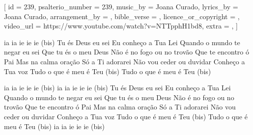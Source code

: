 
[
    id                     = {239},
    psalterio_number       = {239},
    music_by               = {Joana Curado},
    lyrics_by              = {Joana Curado},
    arrangement_by         = {},
    bible_verse            = {},
    licence_or_copyright   = {},
    video_url              = {https://www.youtube.com/watch?v=NTTpphH1bd8},
    extra                  = {},
]

\beginverse
ia ia ie ie ie (bis)
Tu és Deus eu sei
Eu conheço a Tua Lei
Quando o mundo te negar eu sei
Que tu és o meu Deus
Não é no fogo ou no trovão
Que te encontro ó Pai
Mas na calma oração
Só a Ti adorarei
Não vou ceder ou duvidar
Conheço a Tua voz
Tudo o que é meu é Teu (bis)
Tudo o que é meu é Teu (bis)
\endverse

\beginverse
ia ia ie ie ie (bis)
ia ia ie ie ie (bis)
Tu és Deus eu sei
Eu conheço a Tua Lei
Quando o mundo te negar eu sei
Que tu és o meu Deus
Não é no fogo ou no trovão
Que te encontro ó Pai
Mas na calma oração
Só a Ti adorarei
Não vou ceder ou duvidar
Conheço a Tua voz
Tudo o que é meu é Teu (bis)
Tudo o que é meu é Teu (bis)
ia ia ie ie ie (bis)
\endverse

\endsong
